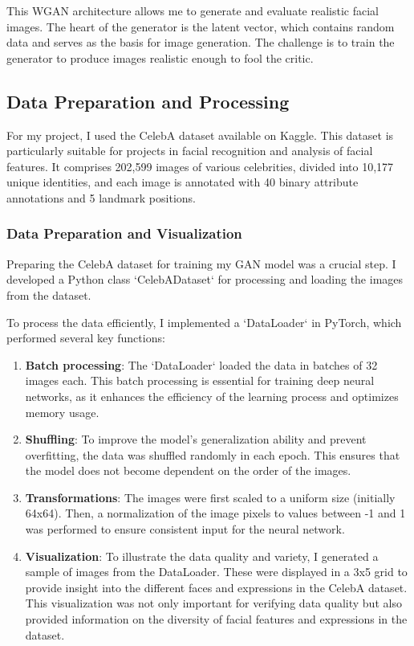 \documentclass[a4paper, 12pt]{article}
\begin{document}
This WGAN architecture allows me to generate and evaluate realistic facial images. The heart of the generator is the latent vector, which contains random data and serves as the basis for image generation. The challenge is to train the generator to produce images realistic enough to fool the critic.

\subsection{Data Preparation and Processing}

For my project, I used the CelebA dataset available on Kaggle. This dataset is particularly suitable for projects in facial recognition and analysis of facial features. It comprises 202,599 images of various celebrities, divided into 10,177 unique identities, and each image is annotated with 40 binary attribute annotations and 5 landmark positions.

\subsubsection{Data Preparation and Visualization}
Preparing the CelebA dataset for training my GAN model was a crucial step. I developed a Python class `CelebADataset` for processing and loading the images from the dataset.

To process the data efficiently, I implemented a `DataLoader` in PyTorch, which performed several key functions:

\begin{enumerate}
 \item \textbf{Batch processing}: The `DataLoader` loaded the data in batches of 32 images each. This batch processing is essential for training deep neural networks, as it enhances the efficiency of the learning process and optimizes memory usage.

 \item \textbf{Shuffling}: To improve the model's generalization ability and prevent overfitting, the data was shuffled randomly in each epoch. This ensures that the model does not become dependent on the order of the images.

 \item \textbf{Transformations}: The images were first scaled to a uniform size (initially 64x64). Then, a normalization of the image pixels to values between -1 and 1 was performed to ensure consistent input for the neural network.

 \item \textbf{Visualization}: To illustrate the data quality and variety, I generated a sample of images from the DataLoader. These were displayed in a 3x5 grid to provide insight into the different faces and expressions in the CelebA dataset. This visualization was not only important for verifying data quality but also provided information on the diversity of facial features and expressions in the dataset.
\end{enumerate}
\end{document}
